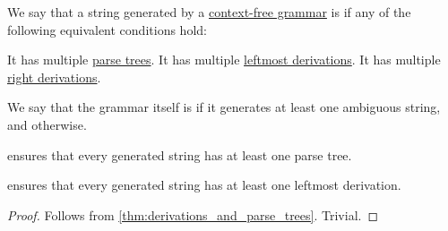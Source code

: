 \begin{definition}\label{def:grammar_ambiguity}
  We say that a string generated by a \hyperref[def:chomsky_hierarchy/context_free]{context-free grammar} is  if any of the following equivalent conditions hold:
  \begin{thmenum}
     It has multiple \hyperref[def:parse_tree]{parse trees}.
     It has multiple \hyperref[def:leftmost_derivation]{leftmost derivations}.
     It has multiple \hyperref[def:leftmost_derivation]{right derivations}.
  \end{thmenum}

  We say that the grammar itself is  if it generates at least one ambiguous string, and  otherwise.
\end{definition}
\begin{comments}
  \item {} ensures that every generated string has at least one parse tree.
  \item {} ensures that every generated string has at least one leftmost derivation.
\end{comments}
\begin{proof}
   Follows from \cref{thm:derivations_and_parse_trees}.
   Trivial.
\end{proof}


